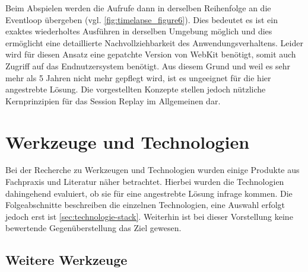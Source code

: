 Beim Abspielen werden die Aufrufe dann in derselben Reihenfolge an die Eventloop übergeben (vgl. \autoref{fig:timelapse_figure6}). Dies bedeutet es ist ein exaktes wiederholtes Ausführen in derselben Umgebung möglich und dies ermöglicht eine detaillierte Nachvollziehbarkeit des Anwendungsverhaltens. Leider wird für diesen Ansatz eine gepatchte Version von WebKit benötigt, somit auch Zugriff auf das Endnutzersystem benötigt. Aus diesem Grund und weil es sehr mehr als 5 Jahren nicht mehr gepflegt wird\footnotemark{}, ist es ungeeignet für die hier angestrebte Lösung. Die vorgestellten Konzepte stellen jedoch nützliche Kernprinzipien für das Session Replay im Allgemeinen dar.


\newpage

\section{Werkzeuge und Technologien}
\label{sec:werkzeuge-und-technologien}

%
%


Bei der Recherche zu Werkzeugen und Technologien wurden einige Produkte aus Fachpraxis und Literatur näher betrachtet. Hierbei wurden die Technologien dahingehend evaluiert, ob sie für eine angestrebte Lösung infrage kommen. Die Folgeabschnitte beschreiben die einzelnen Technologien, eine Auswahl erfolgt jedoch erst ist \autoref{sec:technologie-stack}. Weiterhin ist bei dieser Vorstellung keine bewertende Gegenüberstellung das Ziel gewesen.

\subsection{Weitere Werkzeuge}
\label{sec:weitere-werkzeuge}

